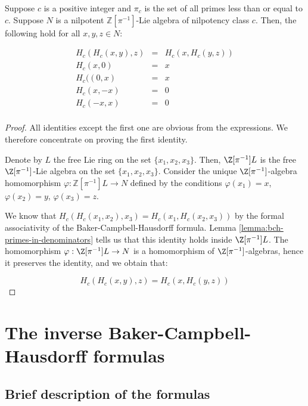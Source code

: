 \documentclass{ucetd}
\begin{document}
\begin{theorem}\label{thm:bch-group-axiom-universal-validity-pi-powered}
  Suppose $c$ is a positive integer and $\pi_c$ is the set of all primes
  less than or equal to $c$. Suppose $N$ is a nilpotent
  $\mathbb{Z}[\pi^{-1}]$-Lie algebra of nilpotency class $c$. Then, the
  following hold for all $x,y,z \in N$:
    
  \begin{eqnarray*}
    H_c(H_c(x,y),z) & = & H_c(x,H_c(y,z)) \\
    H_c(x,0) & = & x \\
    H_c((0,x) & = & x\\
    H_c(x,-x) & = & 0 \\
    H_c(-x,x) & = & 0 \\
  \end{eqnarray*}

\end{theorem}

\begin{proof}
  All identities except the first one are obvious from the
  expressions. We therefore concentrate on proving the first identity.

  Denote by $L$ the free Lie ring on the set $\{
  x_1,x_2,x_3 \}$. Then, $\Z[\pi^{-1}]L$ is the free
  $\Z[\pi^{-1}]$-Lie algebra on the set $\{ x_1,x_2,x_3 \}$. Consider
  the unique $\Z[\pi^{-1}]$-algebra homomorphism $\varphi:
  \mathbb{Z}[\pi^{-1}]L \to N$ defined by the conditions $\varphi(x_1)
  = x$, $\varphi(x_2) = y$, $\varphi(x_3) = z$.

  We know that $H_c(H_c(x_1,x_2),x_3) = H_c(x_1,H_c(x_2,x_3))$ by the
  formal associativity of the Baker-Campbell-Hausdorff formula. Lemma
  \ref{lemma:bch-primes-in-denominators} tells us that this identity
  holds inside $\Z[\pi^{-1}]L$. The homomorphism $\varphi:
  \Z[\pi^{-1}]L \to N$ is a homomorphism of $\Z[\pi^{-1}]$-algebras,
  hence it preserves the identity, and we obtain that:

  $$H_c(H_c(x,y),z) = H_c(x,H_c(y,z))$$
\end{proof}


\section{The inverse Baker-Campbell-Hausdorff formulas}\label{sec:inverse-bch}

\subsection{Brief description of the formulas}
\end{document}
